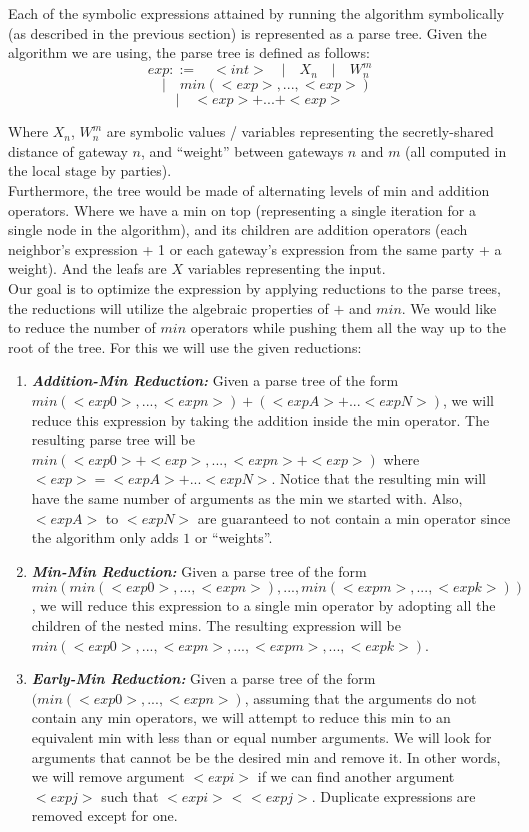Each of the symbolic expressions attained by running the algorithm symbolically (as described in the previous section) is represented as a parse tree. Given the algorithm we are using, the parse tree is defined as follows:
$$ exp ::= \quad <int> \quad | \quad X_n \quad | \quad W_{n}^{m} $$
$$\quad | \quad min(<exp>, ..., <exp>) $$
$$ | \quad <exp> + ... + <exp> $$

Where $X_n$, $W_{n}^{m}$ are symbolic values / variables representing the secretly-shared distance of gateway $n$, and ``weight'' between gateways $n$ and $m$ (all computed in the local stage by parties). \\

Furthermore, the tree would be made of alternating levels of min and addition operators. Where we have a min on top (representing a single iteration for a single node in the algorithm), and its children are addition operators (each neighbor's expression + 1 or each gateway's expression from the same party + a weight). And the leafs are $X$ variables representing the input. \\

Our goal is to optimize the expression by applying reductions to the parse trees, the reductions will utilize the algebraic properties of $+$ and $min$. We would like to reduce the number of $min$ operators while pushing them all the way up to the root of the tree. For this we will use the given reductions:
\begin{enumerate}
\item \emph{\textbf{Addition-Min Reduction:}} Given a parse tree of the form $min(<exp0>, ..., <expn>) + (<expA> + ... <expN>)$, we will reduce this expression by taking the addition inside the min operator. The resulting parse tree will be $min(<exp0> + <exp>, ..., <expn> + <exp>)$ where $<exp> = <expA> + ... <expN>$. Notice that the resulting min will have the same number of arguments as the min we started with. Also, $<expA>$ to $<expN>$ are guaranteed to not contain a min operator since the algorithm only adds $1$ or ``weights''.
\item \emph{\textbf{Min-Min Reduction:}} Given a parse tree of the form $min( min(<exp0>, ..., <expn>), ..., min(<expm>, ..., <expk>))$, we will reduce this expression to a single min operator by adopting all the children of the nested mins. The resulting expression will be $min(<exp0>, ..., <expn>, ..., <expm>, ..., <expk>)$.
\item \emph{\textbf{Early-Min Reduction:}} Given a parse tree of the form $(min(<exp0>, ..., <expn>)$, assuming that the arguments do not contain any min operators, we will attempt to reduce this min to an equivalent min with less than or equal number arguments. We will look for arguments that cannot be be the desired min and remove it. In other words, we will remove argument $<expi>$ if we can find another argument $<expj>$ such that $<expi>$ < $<expj>$. Duplicate expressions are removed except for one.
\end{enumerate}


